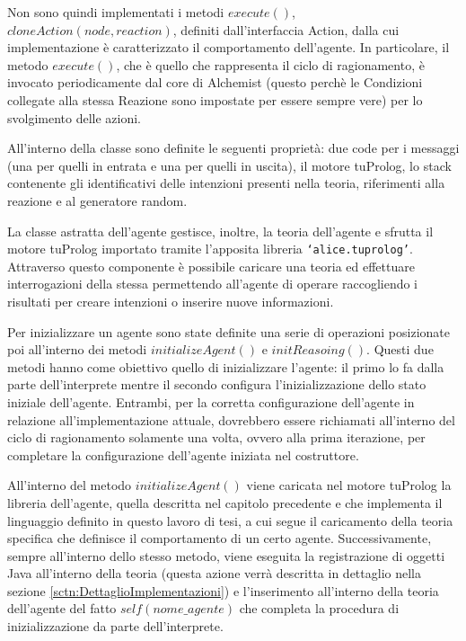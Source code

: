 Non sono quindi implementati i metodi $execute()$, $cloneAction(node, reaction)$, definiti dall'interfaccia Action, dalla cui implementazione è caratterizzato il comportamento dell'agente. In particolare, il metodo $execute()$, che è quello che rappresenta il ciclo di ragionamento, è invocato periodicamente dal core di Alchemist (questo perchè le Condizioni collegate alla stessa Reazione sono impostate per essere sempre vere) per lo svolgimento delle azioni.

All'interno della classe sono definite le seguenti proprietà: due code per i messaggi (una per quelli in entrata e una per quelli in uscita), il motore tuProlog, lo stack contenente gli identificativi delle intenzioni presenti nella teoria, riferimenti alla reazione e al generatore random.

La classe astratta dell'agente gestisce, inoltre, la teoria dell'agente e sfrutta il motore tuProlog importato tramite l'apposita libreria \texttt{`alice.tuprolog’}. Attraverso questo componente è possibile caricare una teoria ed effettuare interrogazioni della stessa permettendo all'agente di operare raccogliendo i risultati per creare intenzioni o inserire nuove informazioni.

Per inizializzare un agente sono state definite una serie di operazioni posizionate poi all'interno dei metodi $initializeAgent()$ e $initReasoing()$.
Questi due metodi hanno come obiettivo quello di inizializzare l'agente: il primo lo fa dalla parte dell'interprete mentre il secondo configura l'inizializzazione dello stato iniziale dell'agente.
Entrambi, per la corretta configurazione dell'agente in relazione all'implementazione attuale, dovrebbero essere richiamati all'interno del ciclo di ragionamento solamente una volta, ovvero alla prima iterazione, per completare la configurazione dell'agente iniziata nel costruttore.

All'interno del metodo $initializeAgent()$ viene caricata nel motore tuProlog la libreria dell'agente, quella descritta nel capitolo precedente e che implementa il linguaggio definito in questo lavoro di tesi, a cui segue il caricamento della teoria specifica che definisce il comportamento di un certo agente. Successivamente, sempre all'interno dello stesso metodo, viene eseguita la registrazione di oggetti Java all'interno della teoria (questa azione verrà descritta in dettaglio nella sezione \ref{sctn:DettaglioImplementazioni}) e l'inserimento all'interno della teoria dell'agente del fatto $self(nome\_agente)$ che completa la procedura di inizializzazione da parte dell'interprete.

